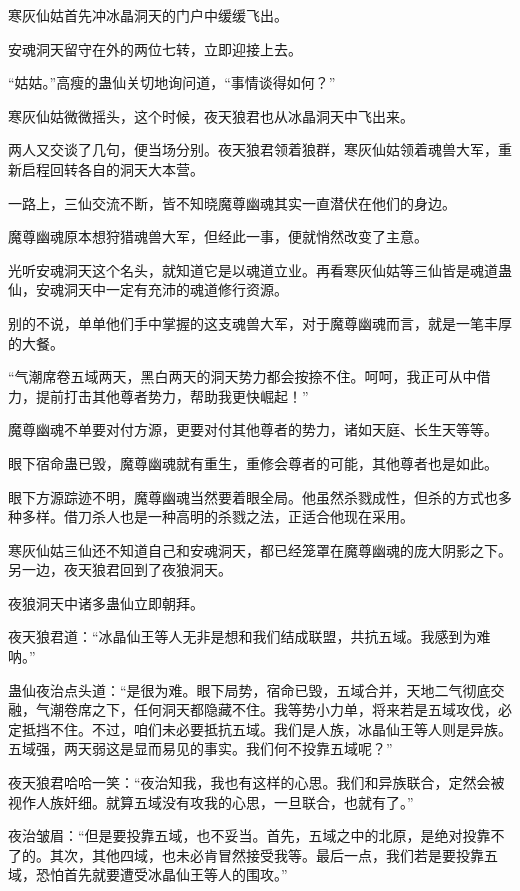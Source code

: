
\begin{this_body}

寒灰仙姑首先冲冰晶洞天的门户中缓缓飞出。

安魂洞天留守在外的两位七转，立即迎接上去。

“姑姑。”高瘦的蛊仙关切地询问道，“事情谈得如何？”

寒灰仙姑微微摇头，这个时候，夜天狼君也从冰晶洞天中飞出来。

两人又交谈了几句，便当场分别。夜天狼君领着狼群，寒灰仙姑领着魂兽大军，重新启程回转各自的洞天大本营。

一路上，三仙交流不断，皆不知晓魔尊幽魂其实一直潜伏在他们的身边。

魔尊幽魂原本想狩猎魂兽大军，但经此一事，便就悄然改变了主意。

光听安魂洞天这个名头，就知道它是以魂道立业。再看寒灰仙姑等三仙皆是魂道蛊仙，安魂洞天中一定有充沛的魂道修行资源。

别的不说，单单他们手中掌握的这支魂兽大军，对于魔尊幽魂而言，就是一笔丰厚的大餐。

“气潮席卷五域两天，黑白两天的洞天势力都会按捺不住。呵呵，我正可从中借力，提前打击其他尊者势力，帮助我更快崛起！”

魔尊幽魂不单要对付方源，更要对付其他尊者的势力，诸如天庭、长生天等等。

眼下宿命蛊已毁，魔尊幽魂就有重生，重修会尊者的可能，其他尊者也是如此。

眼下方源踪迹不明，魔尊幽魂当然要着眼全局。他虽然杀戮成性，但杀的方式也多种多样。借刀杀人也是一种高明的杀戮之法，正适合他现在采用。

寒灰仙姑三仙还不知道自己和安魂洞天，都已经笼罩在魔尊幽魂的庞大阴影之下。另一边，夜天狼君回到了夜狼洞天。

夜狼洞天中诸多蛊仙立即朝拜。

夜天狼君道：“冰晶仙王等人无非是想和我们结成联盟，共抗五域。我感到为难呐。”

蛊仙夜治点头道：“是很为难。眼下局势，宿命已毁，五域合并，天地二气彻底交融，气潮卷席之下，任何洞天都隐藏不住。我等势小力单，将来若是五域攻伐，必定抵挡不住。不过，咱们未必要抵抗五域。我们是人族，冰晶仙王等人则是异族。五域强，两天弱这是显而易见的事实。我们何不投靠五域呢？”

夜天狼君哈哈一笑：“夜治知我，我也有这样的心思。我们和异族联合，定然会被视作人族奸细。就算五域没有攻我的心思，一旦联合，也就有了。”

夜治皱眉：“但是要投靠五域，也不妥当。首先，五域之中的北原，是绝对投靠不了的。其次，其他四域，也未必肯冒然接受我等。最后一点，我们若是要投靠五域，恐怕首先就要遭受冰晶仙王等人的围攻。”


\end{this_body}
